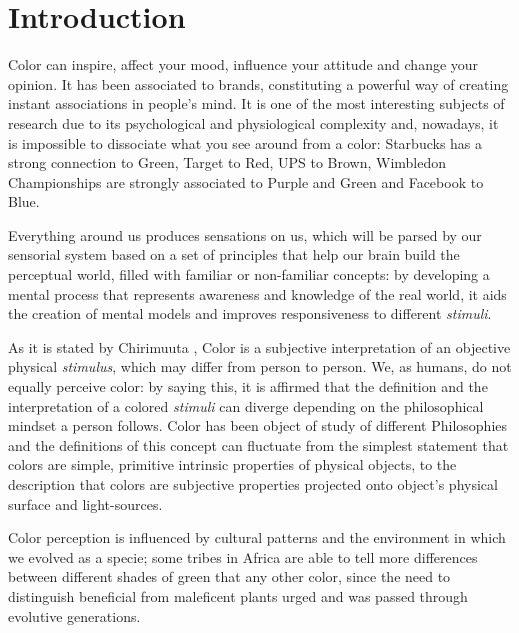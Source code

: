 
\chapter{Introduction}
\label{chapter:introduction}
%
Color can inspire, affect your mood, influence your attitude and change your opinion. It has been associated
to brands, constituting a powerful way of creating instant associations in people’s mind. It is one of the most
interesting subjects of research due to its psychological and physiological complexity and, nowadays, it is
impossible to dissociate what you see around from a color: Starbucks\textsuperscript{\textregistered} has a
strong connection to Green, Target\textsuperscript{\textregistered} to Red, UPS\textsuperscript{\textregistered}
to Brown, Wimbledon Championships\textsuperscript{\textregistered} are strongly associated to Purple and Green
and Facebook\textsuperscript{\textregistered} to Blue. \par
%
Everything around us produces sensations on us, which will be parsed by our sensorial system based on a set
of principles that help our brain build the perceptual world, filled with familiar or non-familiar concepts:
by developing a mental process that represents awareness and knowledge of the real world, it aids the creation
of mental models and improves responsiveness to different \emph{stimuli}. \par
%
As it is stated by Chirimuuta \cite{Chirimuuta2014}, Color is a subjective interpretation of an objective physical
\emph{stimulus}, which may differ from person to person. We, as humans, do not equally perceive color: by saying
this, it is affirmed that the definition and the interpretation of a colored \emph{stimuli} can diverge depending
on the philosophical mindset a person follows. Color has been object of study of different Philosophies and the
definitions of this concept can fluctuate from the simplest statement that colors are simple, primitive intrinsic
properties of physical objects, to the description that colors are subjective properties projected onto object’s
physical surface and light-sources. \par
%
Color perception is influenced by cultural patterns and the environment in which we evolved as a specie; some
tribes in Africa are able to tell more differences between different shades of green that any other color, since
the need to distinguish beneficial from maleficent plants urged and was passed through evolutive generations. \par
